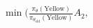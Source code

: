 \documentclass[preview]{standalone}
\begin{document}
\begin{align*}
\min \big(\frac{\pi_\theta(\text{Yellow})}{\pi_{\theta_{\text{old}}}(\text{Yellow})} A_2,
\end{align*}
\end{document}
